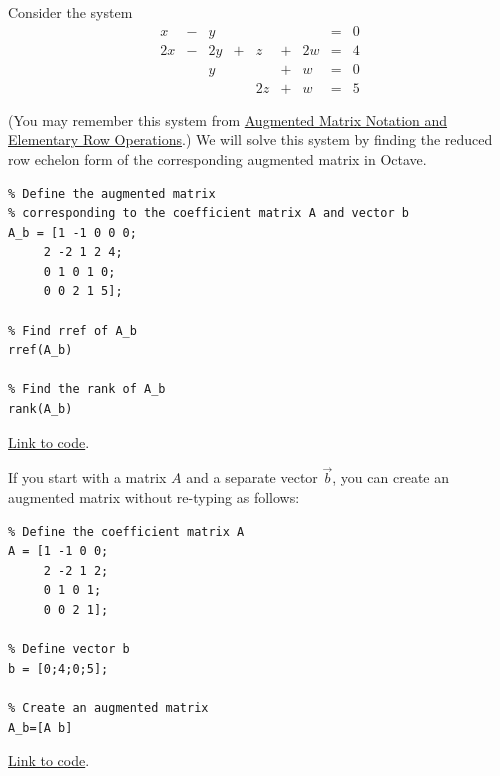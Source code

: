 \documentclass{ximera}
\begin{document}
\begin{template}\label{temp:rref}
Consider the system
\begin{equation}
\begin{array}{ccccccccc}
      x &- &y&&&&&= &0 \\
     2x& -&2y&+&z&+&2w&=&4\\
     & &y&&&+&w&=&0\\
     & &&&2z&+&w&=&5
    \end{array}
    \end{equation}
 
 (You may remember this system from \href{https://ximera.osu.edu/linearalgebrav3/LinearAlgebraInteractiveIntro/SYS-0020/main}{Augmented Matrix Notation and Elementary Row Operations}.)  We will solve this system by finding the reduced row echelon form of the corresponding augmented matrix in Octave. 
    \begin{verbatim}
% Define the augmented matrix
% corresponding to the coefficient matrix A and vector b
A_b = [1 -1 0 0 0;
     2 -2 1 2 4;
     0 1 0 1 0;
     0 0 2 1 5];
      
% Find rref of A_b
rref(A_b)
 
% Find the rank of A_b
rank(A_b)
    \end{verbatim}
 
\href{https://sagecell.sagemath.org/?z=eJxFjsEKwjAMhu-FvsN_Gehh0A49iYfB8CVEpOvSWWSt1Co-vumkmBCS_-cjSYOBnA-EfCOY17xQyDRhMTn5D2xMiZ6PGCYfZuS4UjaSc956JivXw4QJb7I5JoxS9NcRR5w1Wg1V8iAFSnRoO2huu-oo6F_9DYXC7C_VkaLByfMBfsYhOvB6KYrY8LSVgoUJ91V8ASwdNw8=&lang=octave&interacts=eJyLjgUAARUAuQ==}{Link to code}.   
 
    If you start with a matrix $A$ and a separate vector $\vec{b}$, you can create an augmented matrix without re-typing as follows:
    \begin{verbatim}
% Define the coefficient matrix A
A = [1 -1 0 0;
     2 -2 1 2;
     0 1 0 1;
     0 0 2 1];
 
% Define vector b
b = [0;4;0;5];
 
% Create an augmented matrix
A_b=[A b]
    \end{verbatim}
 
\href{https://sagecell.sagemath.org/?z=eJxFjrEKAyEQRHvBf5jmyoNVkkqukOQvjiOoWROL80BMyOdHIZLtHjvMvAlXjikz6pMRDo4xhcS5Yne1pA-sFBYLVoVZgUBGCvTTmDUU9GBCf6s_UouorbEU09h4c6hHgZfC904yJ0PmPEKXwq4yXIZ7PfbmwPefRXO4-WW18NsXtMsrmQ==&lang=octave&interacts=eJyLjgUAARUAuQ==}{Link to code}.
 
\end{template}
 
\end{document}
